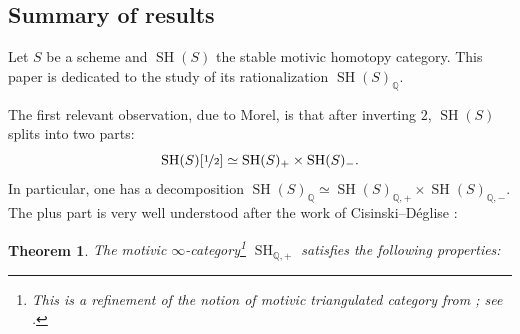 \documentclass[JEP,XML,SOM,Unicode]{cedram}
\DeclareMathOperator{\SH}{SH}
\newcommand{\ot} {{\nicefrac 1 2}}
\newcommand{\QQ} {\mathbb Q}
\newtheorem{thmi}{Theorem}
\theoremstyle{remark}
\theoremstyle{definition}
\numberwithin{equation}{thm}
\begin{document}
\subsection*{Summary of results}

Let $S$ be a scheme and $\SH(S)$ the stable motivic homotopy category.
This paper is dedicated to the study of its rationalization $\SH(S)_\QQ$.

The first relevant observation, due to Morel, is that after inverting $2$, $\SH(S)$ splits into two parts:
\[
\SH(S)[\ot] \simeq \SH(S)_+ \times \SH(S)_-.
\]
In particular, one has a decomposition $\SH(S)_\QQ \simeq \SH(S)_{\QQ,+}\times \SH(S)_{\QQ,-}$.
The plus part is very well understood after the work of Cisinski--Déglise \cite{CD3}:

\begin{thmi}\label{thm:intro_SHQ+}
The motivic $\infty$-category\footnote{This is a refinement of the notion of motivic triangulated category from \cite{CD3}; see \cite{KhanThesis,KhanSix}.} $\SH_{\QQ,+}$ satisfies the following properties:


\end{thmi}
\end{document}
